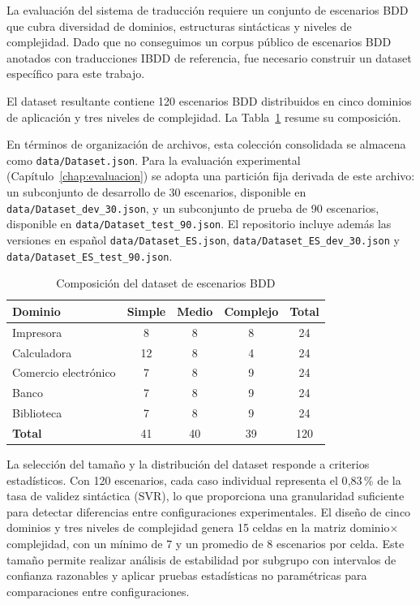 La evaluación del sistema de traducción requiere un conjunto de escenarios BDD que cubra diversidad de dominios, estructuras sintácticas y niveles de complejidad. Dado que no conseguimos un corpus público de escenarios BDD anotados con traducciones IBDD de referencia, fue necesario construir un dataset específico para este trabajo.

El dataset resultante contiene 120 escenarios BDD distribuidos en cinco dominios de aplicación y tres niveles de complejidad. La Tabla~\ref{tab:dataset-enfoque} resume su composición.

En términos de organización de archivos, esta colección consolidada se almacena como \texttt{data/Dataset.json}. Para la evaluación experimental (Capítulo~\ref{chap:evaluacion}) se adopta una partición fija derivada de este archivo: un subconjunto de desarrollo de 30 escenarios, disponible en \texttt{data/Dataset\_dev\_30.json}, y un subconjunto de prueba de 90 escenarios, disponible en \texttt{data/Dataset\_test\_90.json}. El repositorio incluye además las versiones en español \texttt{data/Dataset\_ES.json}, \texttt{data/Dataset\_ES\_dev\_30.json} y \texttt{data/Dataset\_ES\_test\_90.json}.

\begin{table}[htbp]
\centering
\caption{Composición del dataset de escenarios BDD}
\label{tab:dataset-enfoque}
\begin{tabular}{lcccc}
\hline
\textbf{Dominio} & \textbf{Simple} & \textbf{Medio} & \textbf{Complejo} & \textbf{Total} \\
\hline
Impresora       & 8  & 8  & 8  & 24 \\
Calculadora     & 12 & 8  & 4  & 24 \\
Comercio electrónico & 7  & 8  & 9  & 24 \\
Banco           & 7  & 8  & 9  & 24 \\
Biblioteca      & 7  & 8  & 9  & 24 \\
\hline
\textbf{Total}  & 41 & 40 & 39 & 120 \\
\hline
\end{tabular}
\end{table}

La selección del tamaño y la distribución del dataset responde a criterios estadísticos. Con 120 escenarios, cada caso individual representa el 0{,}83\,\% de la tasa de validez sintáctica (SVR), lo que proporciona una granularidad suficiente para detectar diferencias entre configuraciones experimentales. El diseño de cinco dominios y tres niveles de complejidad genera 15 celdas en la matriz dominio$\times$complejidad, con un mínimo de 7 y un promedio de 8 escenarios por celda. Este tamaño permite realizar análisis de estabilidad por subgrupo con intervalos de confianza razonables y aplicar pruebas estadísticas no paramétricas para comparaciones entre configuraciones.

